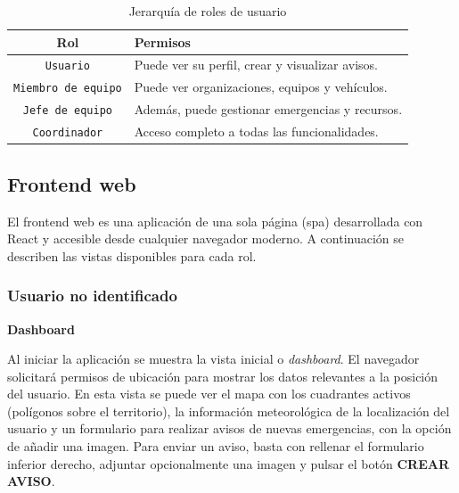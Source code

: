 \begin{table}[H]
  \centering
  \begin{tabular}{|c|l|}
    \hline
    \textbf{Rol} & \textbf{Permisos} \\
    \hline
    \texttt{Usuario} & Puede ver su perfil, crear y visualizar avisos. \\
    \texttt{Miembro de equipo} & Puede ver organizaciones, equipos y vehículos. \\
    \texttt{Jefe de equipo} & Además, puede gestionar emergencias y recursos. \\
    \texttt{Coordinador} & Acceso completo a todas las funcionalidades. \\
    \hline
  \end{tabular}
  \caption{Jerarquía de roles de usuario}
  \label{tab:roles}
\end{table}

\clearpage

\subsection{Frontend web}
\label{sec:manual-web}

El frontend web es una aplicación de una sola página (\acrshort{spa}) desarrollada con React y accesible desde cualquier navegador moderno. A continuación se describen las vistas disponibles para cada rol.

\subsubsection{Usuario no identificado}
\label{sec:web-anon}

\textbf{Dashboard}

Al iniciar la aplicación se muestra la vista inicial o \textit{dashboard}. El navegador solicitará permisos de ubicación para mostrar los datos relevantes a la posición del usuario. En esta vista se puede ver el mapa con los cuadrantes activos (polígonos sobre el territorio), la información meteorológica de la localización del usuario y un formulario para realizar avisos de nuevas emergencias, con la opción de añadir una imagen. Para enviar un aviso, basta con rellenar el formulario inferior derecho, adjuntar opcionalmente una imagen y pulsar el botón \textbf{CREAR AVISO}.

